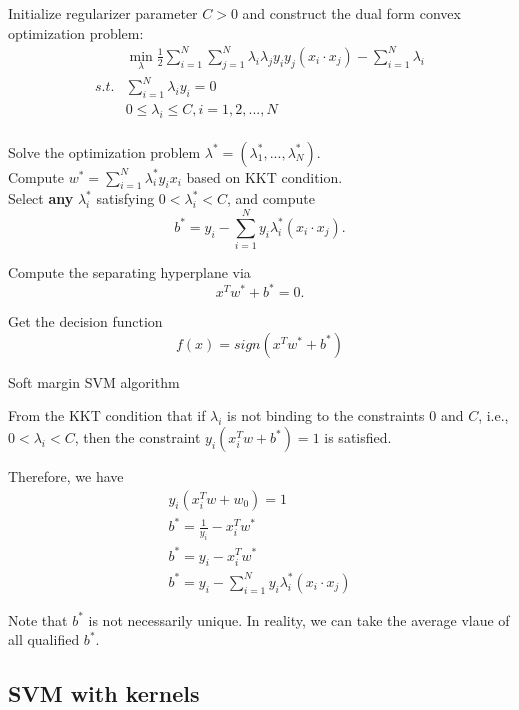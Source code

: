 \begin{refsection}
\begin{algorithm}[H]
	\SetAlgoLined
	Initialize regularizer parameter $C>0$ and construct the dual form convex optimization problem:
	\begin{align*}
	& \min_{\lambda} \frac{1}{2}\sum_{i=1}^N\sum_{j=1}^N \lambda_i\lambda_j y_iy_j(x_i\cdot x_j) - \sum_{i=1}^N \lambda_i \\
	s.t. &  \sum_{i=1}^N \lambda_i y_i = 0\\
	& 0 \leq \lambda_i \leq C, i=1,2,...,N
	\end{align*}\\
	Solve the optimization problem $\lambda^*=(\lambda_1^*,...,\lambda_N^*)$.\\
	Compute $w^* = \sum_{i=1}^N \lambda_i^* y_ix_i$ based on KKT condition.\\
	Select \textbf{any} $\lambda_i^*$ satisfying $0<\lambda_i^*<C$, and compute
	$$b^* = y_i - \sum_{i=1}^N y_i \lambda_i^* (x_i\cdot x_j).$$
	
	Compute the separating hyperplane via
	$$x^Tw^* + b^* = 0.$$

	Get the decision function
	$$f(x) = sign(x^Tw^* + b^*)$$
	
	\caption{Soft margin SVM algorithm}
\end{algorithm}


\begin{remark}
From the KKT condition that if $\lambda_i$ is not binding to the constraints $0$ and $C$, i.e., $0<\lambda_i<C$, then the constraint $	y_i(x_i^Tw + b^*) = 1$ is satisfied.

Therefore, we have
\begin{align*}
y_i(x_i^Tw + w_0) = 1 \\
b^* = \frac{1}{y_i} - x_i^Tw^* \\
b^* = y_i - x_i^Tw^* \\
b^* = y_i - \sum_{i=1}^N y_i \lambda_i^* (x_i\cdot x_j) 
\end{align*}
	
Note that $b^*$ is not necessarily unique.	In reality, we can take the average vlaue of all qualified $b^*$.
\end{remark}


\subsection{SVM with kernels}

\end{refsection}
